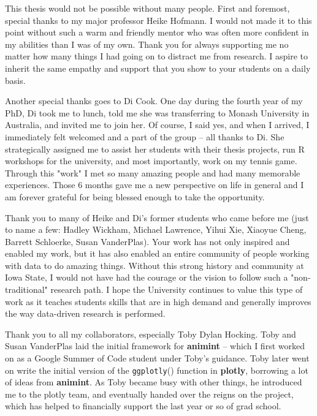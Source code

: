 
This thesis would not be possible without many people. First and foremost, special thanks to my major professor Heike Hofmann. I would not made it to this point without such a warm and friendly mentor who was often more confident in my abilities than I was of my own. Thank you for always supporting me no matter how many things I had going on to distract me from research. I aspire to inherit the same empathy and support that you show to your students on a daily basis. 

Another special thanks goes to Di Cook. One day during the fourth year of my PhD, Di took me to lunch, told me she was transferring to Monash University in Australia, and invited me to join her. Of course, I said yes, and when I arrived, I immediately felt welcomed and a part of the group -- all thanks to Di. She strategically assigned me to assist her students with their thesis projects, run R workshops for the university, and most importantly, work on my tennis game. Through this "work" I met so many amazing people and had many memorable experiences. Those 6 months gave me a new perspective on life in general and I am forever grateful for being blessed enough to take the opportunity.

Thank you to many of Heike and Di's former students who came before me (just to name a few: Hadley Wickham, Michael Lawrence, Yihui Xie, Xiaoyue Cheng, Barrett Schloerke, Susan VanderPlas). Your work has not only inspired and enabled my work, but it has also enabled an entire community of people working with data to do amazing things. Without this strong history and community at Iowa State, I would not have had the courage or the vision to follow such a "non-traditional" research path. I hope the University continues to value this type of work as it teaches students skills that are in high demand and generally improves the way data-driven research is performed.

Thank you to all my collaborators, especially Toby Dylan Hocking. Toby and Susan VanderPlas laid the initial framework for \textbf{animint} -- which I first worked on as a Google Summer of Code student under Toby's guidance. Toby later went on write the initial version of the \texttt{ggplotly}() function in \textbf{plotly}, borrowing a lot of ideas from \textbf{animint}. As Toby became busy with other things, he introduced me to the plotly team, and eventually handed over the reigns on the project, which has helped to financially support the last year or so of grad school.

